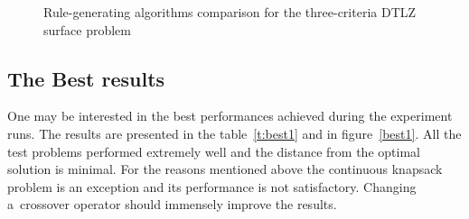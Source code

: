\begin{figure}
  \centering
  \caption{Rule-generating algorithms comparison for the three-criteria DTLZ surface problem}
  \label{c3_surface_algo}
\end{figure}


\clearpage{}

\subsection{The Best results}
One may be interested in the best performances achieved during the experiment
runs. The results are presented in the table~\ref{t:best1} and in
figure~\ref{best1}. All the test problems performed extremely well and the
distance from the optimal solution is minimal. For the reasons mentioned above
the continuous knapsack problem is an exception and its performance is not
satisfactory. Changing a~crossover operator should immensely improve the
results.

